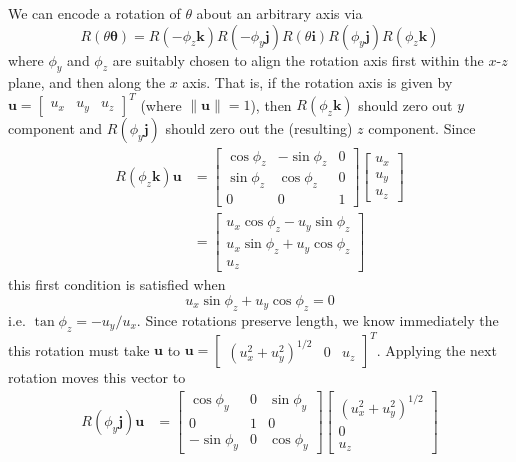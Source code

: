 \documentclass[../principles-of-quantum-mechanics.tex]{subfiles}
\begin{document}
\begin{questions}
	\begin{solution}
		We can encode a rotation of $\theta$ about an arbitrary axis via
		$$R(\theta\boldsymbol{\theta}) = R(-\phi_z\mathbf{k})R(-\phi_y\mathbf{j})R(\theta\mathbf{i})R(\phi_y\mathbf{j})R(\phi_z\mathbf{k})$$
		where $\phi_y$ and $\phi_z$ are suitably chosen to align the rotation axis first within the $x$-$z$ plane, and then along the $x$ axis. That is, if the rotation axis is given by $\mathbf{u} = \begin{bmatrix}u_x & u_y & u_z\end{bmatrix}^T$ (where $\|\mathbf{u}\| = 1$), then $R(\phi_z\mathbf{k})$ should zero out $y$ component and $R(\phi_y\mathbf{j})$ should zero out the (resulting) $z$ component. Since
		\begin{align*}
			R(\phi_z\mathbf{k})\mathbf{u} &= \begin{bmatrix}\cos\phi_z & -\sin\phi_z & 0 \\ \sin\phi_z & \cos\phi_z & 0 \\ 0 & 0 & 1\end{bmatrix}\begin{bmatrix}u_x \\ u_y \\ u_z\end{bmatrix} \\
			&= \begin{bmatrix}u_x\cos\phi_z - u_y\sin\phi_z \\ u_x\sin\phi_z + u_y\cos\phi_z \\ u_z\end{bmatrix}
		\end{align*}
		this first condition is satisfied when
		$$u_x\sin\phi_z + u_y\cos\phi_z = 0$$
		i.e. $\tan\phi_z = -u_y/u_x$. Since rotations preserve length, we know immediately the this rotation must take $\mathbf{u}$ to $\mathbf{u}= \begin{bmatrix}(u_x^2 + u_y^2)^{1/2} & 0 & u_z\end{bmatrix}^T$. Applying the next rotation moves this vector to
		\begin{align*}
			R(\phi_y\mathbf{j})\mathbf{u} &= \begin{bmatrix}\cos\phi_y & 0 & \sin\phi_y \\ 0 & 1 & 0 \\ -\sin\phi_y & 0 & \cos\phi_y\end{bmatrix}\begin{bmatrix}(u_x^2+u_y^2)^{1/2} \\ 0 \\ u_z\end{bmatrix} \\

\end{align*}
\end{solution}
\end{questions}
\end{document}

